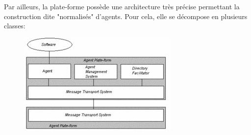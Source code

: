 \documentclass{beamer}
\begin{document}
  \begin{frame}
   Par ailleurs, la plate-forme possède une architecture très précise permettant la construction dite "normalisés" d’agents. 
   Pour cela, elle se décompose en plusieurs classes:
   \begin{figure}[H]
      \centering
      \includegraphics[scale=0.5]{image/fipa.jpg} 
      \label{fig:échiquierDebut}
  \end{figure}
  \end{frame}
  
\end{document}
